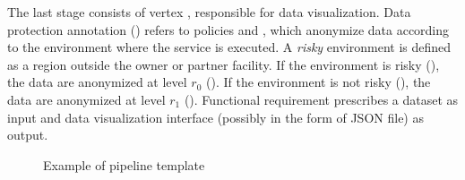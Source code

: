 \begin{example}[\bf \pipelineTemplate]
The last stage consists of vertex , responsible for data visualization.
Data protection annotation \myLambda() refers to policies  and , which anonymize data according to the environment where the service is executed.
A \emph{risky} environment is defined as a region outside the owner or partner facility.
If the environment is risky (), the data are anonymized at level $r_0$ ().
If the environment is not risky (), the data are anonymized at level $r_1$ ().
Functional requirement  prescribes a dataset as input and data visualization interface (possibly in the form of JSON file) as output.
\end{example}

\begin{figure}
  \centering
  \caption{\label{fig:pipeline_template_example}Example of pipeline template}
\end{figure}